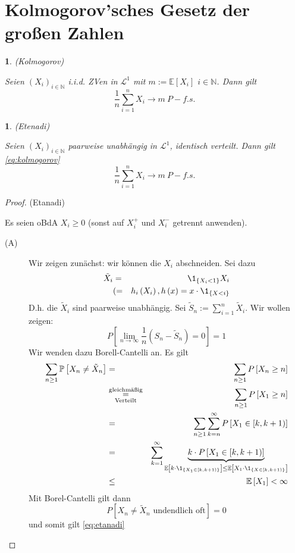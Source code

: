 \documentclass[10pt,a4paper]{report}
\numberwithin{equation}{section}
\numberwithin{figure}{section}
\theoremstyle{plain}
\theoremstyle{definition}
\theoremstyle{plain}
\newtheorem{prop}[thm]{\protect\propositionname}
\theoremstyle{definition}
\theoremstyle{remark}
\theoremstyle{plain}
\providecommand{\propositionname}{Satz}
\begin{document}
\section{Kolmogorov'sches Gesetz der großen Zahlen}
\begin{prop}
(Kolmogorov)

Seien $\left(X_{i}\right)_{i\in\mathbb{N}}$ i.i.d. ZVen in $\mathcal{L}^{1}$
mit $m:=\mathbb{E}\left[X_{i}\right]$ $i\in\mathbb{N}$. Dann gilt
\begin{equation}
\frac{1}{n}\sum_{i=1}^{n}X_{i}\to m\ P-f.s.\label{eq:kolmogorov}
\end{equation}

\end{prop}

\begin{prop}
(Etenadi)

Seien $\left(X_{i}\right)_{i\in\mathbb{N}}$ \emph{paarweise }unabhängig
in $\mathcal{L}^{1}$, identisch verteilt. Dann gilt \ref{eq:kolmogorov}
\[
\frac{1}{n}\sum_{i=1}^{n}X_{i}\to m\ P-f.s.
\]
\end{prop}
\begin{proof}
(Etanadi)

Es seien oBdA $X_{i}\geq0$ (sonst auf $X_{i}^{+}$ und $X_{i}^{-}$
getrennt anwenden).
\begin{description}
\item [{(A)}] Wir zeigen zunächst: wir können die $X_{i}$ abschneiden.
Sei dazu 
\begin{eqnarray*}
\tilde{X}_{i} & = & \1_{\left\{ X_{i}<1\right\} }X_{i}\\
 & (= & h_{i}\left(X_{i}\right),h\left(x\right)=x\cdot\1_{\left\{ X<i\right\} }
\end{eqnarray*}
D.h. die $\tilde{X}_{i}$ sind paarweise unabhängig. Sei $\tilde{S}_{n}:=\sum_{i=1}^{n}\tilde{X}_{i}$.
Wir wollen zeigen:
\begin{equation}
P\left[\lim_{n\to\infty}\frac{1}{n}\left(S_{n}-\tilde{S}_{n}\right)=0\right]=1\label{eq:etanadi}
\end{equation}
Wir wenden dazu Borell-Cantelli an. Es gilt
\begin{eqnarray*}
\sum_{n\geq1}\mathbb{P}\left[X_{n}\neq\tilde{X}_{n}\right] & = & \sum_{n\geq1}P\left[X_{n}\geq n\right]\\
 & \overset{\text{gleichmäßig}}{\underset{\text{Verteilt}}{=}} & \sum_{n\geq1}P\left[X_{1}\geq n\right]\\
 & = & \sum_{n\geq1}\sum_{k=n}^{\infty}P\left[X_{1}\in[k,k+1)\right]\\
 & = & \sum_{k=1}^{\infty}\underset{\mathbb{E}\left[k\cdot\1_{\left\{ X_{1}\in[k,k+1)\right\} }\right]\leq\mathbb{E}\left[X_{1}\cdot\1_{\left\{ X\in[k,k+1)\right\} }\right]}{\underbrace{k\cdot P\left[X_{1}\in[k,k+1)\right]}}\\
 & \leq & \mathbb{E}\left[X_{1}\right]<\infty
\end{eqnarray*}
Mit Borel-Cantelli gilt dann
\[
P\left[X_{n}\neq\tilde{X}_{n}\text{ undendlich oft}\right]=0
\]
und somit gilt \ref{eq:etanadi}
\end{description}
\end{proof}
\printindex{}
\end{document}
